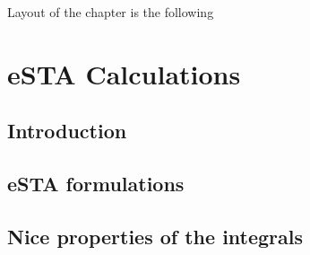 Layout of the chapter is the following
\section{eSTA Calculations}

\subsection{Introduction} %


\subsection{eSTA formulations}


\subsection{Nice properties of the integrals} %
% 

